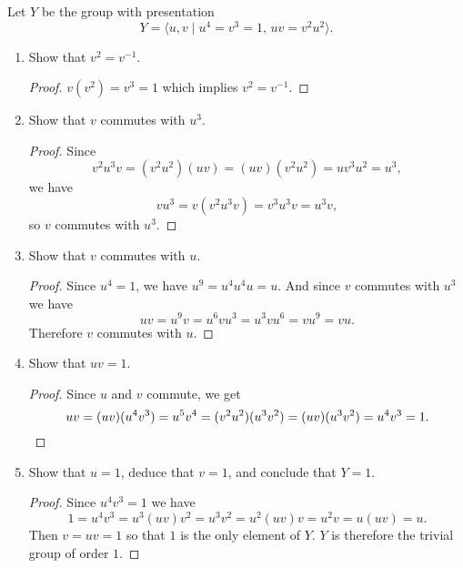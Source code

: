  Let $Y$ be the group with presentation
\begin{equation*}
  Y = \langle u,v\mid u^4 = v^3 = 1,\, uv = v^2u^2\rangle.
\end{equation*}
\begin{enumerate}
\item Show that $v^2 = v^{-1}$.
  \begin{proof}
    $v(v^2) = v^3 = 1$ which implies $v^2 = v^{-1}$.
  \end{proof}
\item Show that $v$ commutes with $u^3$.
  \begin{proof}
    Since
    \begin{equation*}
      v^2u^3v = (v^2u^2)(uv) = (uv)(v^2u^2) = uv^3u^2 = u^3,
    \end{equation*}
    we have
    \begin{equation*}
      vu^3 = v(v^2u^3v) = v^3u^3v = u^3v,
    \end{equation*}
    so $v$ commutes with $u^3$.
  \end{proof}
\item Show that $v$ commutes with $u$.
  \begin{proof}
    Since $u^4 = 1$, we have $u^9 = u^4u^4u = u$. And since $v$
    commutes with $u^3$ we have
    \begin{equation*}
      uv = u^9v = u^6vu^3 = u^3vu^6 = vu^9 = vu.
    \end{equation*}
    Therefore $v$ commutes with $u$.
  \end{proof}
\item Show that $uv = 1$.
  \begin{proof}
    Since $u$ and $v$ commute, we get
    \begin{equation*}
      uv = (uv)(u^4v^3) = u^5v^4 = (v^2u^2)(u^3v^2)
      = (uv)(u^3v^2) = u^4v^3 = 1.\qedhere
    \end{equation*}
  \end{proof}
\item Show that $u = 1$, deduce that $v = 1$, and conclude that
  $Y = 1$.
  \begin{proof}
    Since $u^4v^3 = 1$ we have
    \begin{equation*}
      1 = u^4v^3 = u^3(uv)v^2 = u^3v^2 = u^2(uv)v = u^2v = u(uv) = u.
    \end{equation*}
    Then $v = uv = 1$ so that $1$ is the only element of $Y$. $Y$ is
    therefore the trivial group of order $1$.
  \end{proof}
\end{enumerate}
